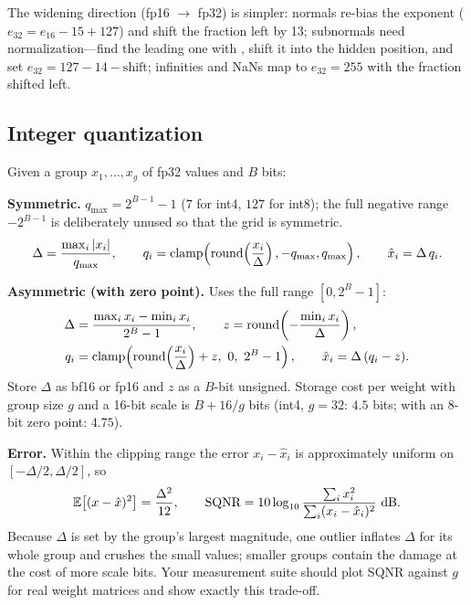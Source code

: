 The widening direction (fp16 $\to$ fp32) is simpler: normals re-bias the exponent ($e_{32} = e_{16} - 15 + 127$) and shift the fraction left by 13; subnormals need normalization---find the leading one with , shift it into the hidden position, and set $e_{32} = 127 - 14 - \text{shift}$; infinities and NaNs map to $e_{32}=255$ with the fraction shifted left.

\subsection{Integer quantization}

Given a group $x_1,\dots,x_g$ of fp32 values and $B$ bits:

\textbf{Symmetric.} $q_{\max} = 2^{B-1}-1$ ($7$ for int4, $127$ for int8); the full negative range $-2^{B-1}$ is deliberately unused so that the grid is symmetric.
\begin{equation}
  \Delta = \frac{\max_i |x_i|}{q_{\max}},\qquad
  q_i = \operatorname{clamp}\!\left(\operatorname{round}\!\left(\frac{x_i}{\Delta}\right), -q_{\max}, q_{\max}\right),\qquad
  \hat{x}_i = \Delta\, q_i .
\end{equation}

\textbf{Asymmetric (with zero point).} Uses the full range $[0, 2^B-1]$:
\begin{align}
  \Delta &= \frac{\max_i x_i - \min_i x_i}{2^B - 1},\qquad
  z = \round\!\left(-\frac{\min_i x_i}{\Delta}\right),\\
  q_i &= \clamp\!\left(\round\!\left(\frac{x_i}{\Delta}\right) + z,\ 0,\ 2^B-1\right),\qquad
  \hat{x}_i = \Delta\,(q_i - z).
\end{align}
Store $\Delta$ as bf16 or fp16 and $z$ as a $B$-bit unsigned. Storage cost per weight with group size $g$ and a 16-bit scale is $B + 16/g$ bits (int4, $g=32$: $4.5$ bits; with an 8-bit zero point: $4.75$).

\textbf{Error.} Within the clipping range the error $x_i - \hat{x}_i$ is approximately uniform on $[-\Delta/2, \Delta/2]$, so
\begin{equation}
  \mathbb{E}\big[(x-\hat{x})^2\big] = \frac{\Delta^2}{12},
  \qquad
  \text{SQNR} = 10\log_{10}\frac{\sum_i x_i^2}{\sum_i (x_i-\hat{x}_i)^2}\ \text{dB}.
\end{equation}
Because $\Delta$ is set by the group's largest magnitude, one outlier inflates $\Delta$ for its whole group and crushes the small values; smaller groups contain the damage at the cost of more scale bits. Your measurement suite should plot SQNR against $g$ for real weight matrices and show exactly this trade-off.

